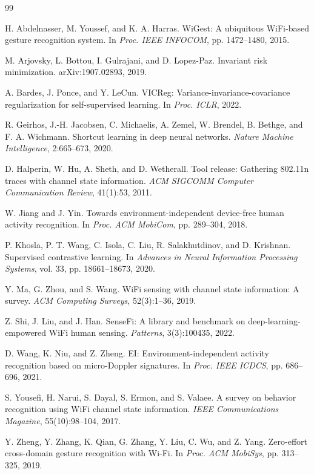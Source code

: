 \documentclass[runningheads]{llncs}
\begin{document}
\begin{thebibliography}{99}

H. Abdelnasser, M. Youssef, and K. A. Harras.
WiGest: A ubiquitous WiFi-based gesture recognition system.
In \textit{Proc. IEEE INFOCOM}, pp. 1472--1480, 2015.

M. Arjovsky, L. Bottou, I. Gulrajani, and D. Lopez-Paz.
Invariant risk minimization.
arXiv:1907.02893, 2019.

A. Bardes, J. Ponce, and Y. LeCun.
VICReg: Variance-invariance-covariance regularization for self-supervised learning.
In \textit{Proc. ICLR}, 2022.

R. Geirhos, J.-H. Jacobsen, C. Michaelis, A. Zemel, W. Brendel, B. Bethge, and F. A. Wichmann.
Shortcut learning in deep neural networks.
\textit{Nature Machine Intelligence}, 2:665--673, 2020.

D. Halperin, W. Hu, A. Sheth, and D. Wetherall.
Tool release: Gathering 802.11n traces with channel state information.
\textit{ACM SIGCOMM Computer Communication Review}, 41(1):53, 2011.

W. Jiang and J. Yin.
Towards environment-independent device-free human activity recognition.
In \textit{Proc. ACM MobiCom}, pp. 289--304, 2018.

P. Khosla, P. T. Wang, C. Isola, C. Liu, R. Salakhutdinov, and D. Krishnan.
Supervised contrastive learning.
In \textit{Advances in Neural Information Processing Systems}, vol. 33, pp. 18661--18673, 2020.

Y. Ma, G. Zhou, and S. Wang.
WiFi sensing with channel state information: A survey.
\textit{ACM Computing Surveys}, 52(3):1--36, 2019.

Z. Shi, J. Liu, and J. Han.
SenseFi: A library and benchmark on deep-learning-empowered WiFi human sensing.
\textit{Patterns}, 3(3):100435, 2022.

D. Wang, K. Niu, and Z. Zheng.
EI: Environment-independent activity recognition based on micro-Doppler signatures.
In \textit{Proc. IEEE ICDCS}, pp. 686--696, 2021.

S. Yousefi, H. Narui, S. Dayal, S. Ermon, and S. Valaee.
A survey on behavior recognition using WiFi channel state information.
\textit{IEEE Communications Magazine}, 55(10):98--104, 2017.

Y. Zheng, Y. Zhang, K. Qian, G. Zhang, Y. Liu, C. Wu, and Z. Yang.
Zero-effort cross-domain gesture recognition with Wi-Fi.
In \textit{Proc. ACM MobiSys}, pp. 313--325, 2019.

\end{thebibliography}
\end{document}

